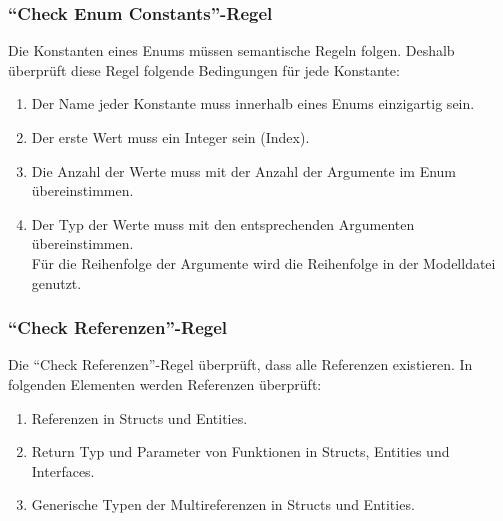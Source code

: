 \documentclass[./einleitung.tex]{subfiles}
\begin{document}
    \subsubsection{``Check Enum Constants''-Regel}
    Die Konstanten eines Enums müssen semantische Regeln folgen.
    Deshalb überprüft diese Regel folgende Bedingungen für jede Konstante:
    \begin{enumerate}
        \item Der Name jeder Konstante muss innerhalb eines Enums einzigartig sein.
        \item Der erste Wert muss ein Integer sein (Index).
        \item Die Anzahl der Werte muss mit der Anzahl der Argumente im Enum übereinstimmen.
        \item Der Typ der Werte muss mit den entsprechenden Argumenten übereinstimmen. \\
        Für die Reihenfolge der Argumente wird die Reihenfolge in der Modelldatei genutzt.
    \end{enumerate}

    \subsubsection{``Check Referenzen''-Regel}
    Die ``Check Referenzen''-Regel überprüft, dass alle Referenzen existieren.
    In folgenden Elementen werden Referenzen überprüft:
    \begin{enumerate}
        \item Referenzen in Structs und Entities.
        \item Return Typ und Parameter von Funktionen in Structs, Entities und Interfaces.
        \item Generische Typen der Multireferenzen in Structs und Entities.
    \end{enumerate}
\end{document}
